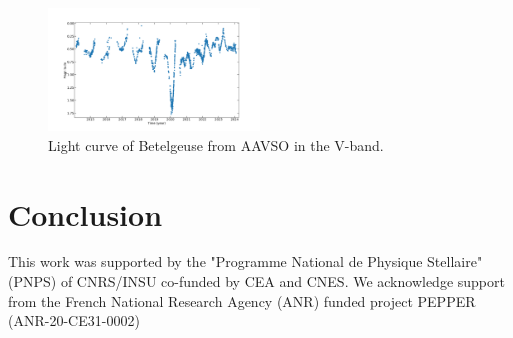 \documentclass{aa}
\begin{document}
\begin{figure}[!h]
    \centering
    \includegraphics[width=0.5\textwidth]{Light_curve_Betelgeuse.png}
    \caption{Light curve of Betelgeuse from AAVSO in the V-band.}
    \label{light curve Betelgeuse}
\end{figure}


\section{Conclusion}

\begin{acknowledgements}
    This work was supported by the "Programme National de Physique Stellaire" (PNPS) of CNRS/INSU co-funded by CEA and CNES.
    We acknowledge support from the French National Research Agency (ANR)
    funded project PEPPER (ANR-20-CE31-0002)
    \end{acknowledgements}
    
    
    
    
\end{document}
